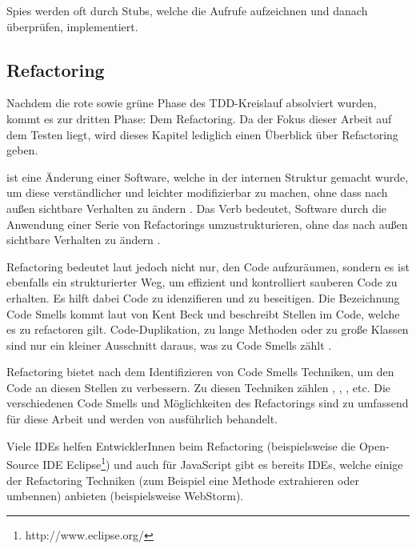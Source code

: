 Spies werden oft durch Stubs, welche die Aufrufe aufzeichnen und danach überprüfen, implementiert.

\subsection{Refactoring}
Nachdem die rote sowie grüne Phase des TDD-Kreislauf absolviert wurden, kommt es zur dritten Phase: Dem Refactoring. Da der Fokus dieser Arbeit auf dem Testen liegt, wird dieses Kapitel lediglich einen Überblick über Refactoring geben.

 ist eine Änderung einer Software, welche in der internen Struktur gemacht wurde, um diese verständlicher und leichter modifizierbar zu machen, ohne dass nach außen sichtbare Verhalten zu ändern \autocite[53]{Fowler:2012}. Das Verb  bedeutet, Software durch die Anwendung einer Serie von Refactorings umzustrukturieren, ohne das nach außen sichtbare Verhalten zu ändern \autocite[54]{Fowler:2012}.

Refactoring bedeutet laut \cite{Fowler:2012} jedoch nicht nur, den Code aufzuräumen, sondern es ist ebenfalls ein strukturierter Weg, um effizient und kontrolliert sauberen Code zu erhalten. Es hilft dabei Code  zu idenzifieren und zu beseitigen. Die Bezeichnung Code Smells kommt laut \cite{Fowler:2012} von Kent Beck und beschreibt Stellen im Code, welche es zu refactoren gilt. Code-Duplikation, zu lange Methoden oder zu große Klassen sind nur ein kleiner Ausschnitt daraus, was zu Code Smells zählt \autocite[67-88]{Fowler:2012}.

Refactoring bietet nach dem Identifizieren von Code Smells Techniken, um den Code an diesen Stellen zu verbessern. Zu diesen Techniken zählen , , , etc. Die verschiedenen Code Smells und Möglichkeiten des Refactorings sind zu umfassend für diese Arbeit und werden von \cite{Fowler:2012} ausführlich behandelt.

Viele IDEs helfen EntwicklerInnen beim Refactoring (beispielsweise die Open-Source IDE Eclipse\footnote{http://www.eclipse.org/}) und auch für JavaScript gibt es bereits IDEs, welche einige der Refactoring Techniken (zum Beispiel eine Methode extrahieren oder umbennen) anbieten (beispielsweise WebStorm).

